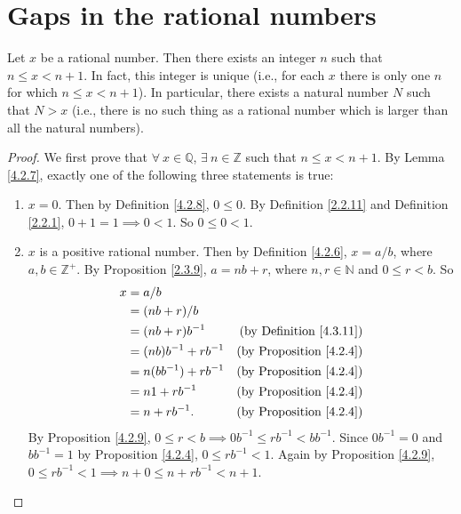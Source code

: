 \section{Gaps in the rational numbers}\label{sec 4.4}

\begin{proposition}\label{4.4.1}
Let \(x\) be a rational number.
Then there exists an integer \(n\) such that \(n \leq x < n + 1\).
In fact, this integer is unique (i.e., for each \(x\) there is only one \(n\) for which \(n \leq x < n + 1\)).
In particular, there exists a natural number \(N\) such that \(N > x\)
(i.e., there is no such thing as a rational number which is larger than all the natural numbers).
\end{proposition}

\begin{proof}
We first prove that \(\forall\ x \in \mathds{Q}\), \(\exists\ n \in \mathds{Z}\) such that \(n \leq x < n + 1\).
By Lemma \ref{4.2.7}, exactly one of the following three statements is true:
\begin{enumerate}
    \item \(x = 0\).
    Then by Definition \ref{4.2.8}, \(0 \leq 0\).
    By Definition \ref{2.2.11} and Definition \ref{2.2.1}, \(0 + 1 = 1 \implies 0 < 1\).
    So \(0 \leq 0 < 1\).
    \item \(x\) is a positive rational number.
    Then by Definition \ref{4.2.6}, \(x = a / b\), where \(a, b \in \mathds{Z}^+\).
    By Proposition \ref{2.3.9}, \(a = nb + r\), where \(n, r \in \mathds{N}\) and \(0 \leq r < b\).
    So
    \begin{align*}
    x &= a / b \\
    &= (nb + r) / b \\
    &= (nb + r)b^{-1} & \text{(by Definition \ref{4.3.11})} \\
    &= (nb)b^{-1} + rb^{-1} & \text{(by Proposition \ref{4.2.4})} \\
    &= n(bb^{-1}) + rb^{-1} & \text{(by Proposition \ref{4.2.4})} \\
    &= n1 + rb^{-1} & \text{(by Proposition \ref{4.2.4})} \\
    &= n + rb^{-1}. & \text{(by Proposition \ref{4.2.4})}
    \end{align*}
    By Proposition \ref{4.2.9}, \(0 \leq r < b \implies 0b^{-1} \leq rb^{-1} < bb^{-1}\).
    Since \(0b^{-1} = 0\) and \(bb^{-1} = 1\) by Proposition \ref{4.2.4}, \(0 \leq rb^{-1} < 1\).
    Again by Proposition \ref{4.2.9}, \(0 \leq rb^{-1} < 1 \implies n + 0 \leq n + rb^{-1} < n + 1\).

\end{enumerate}
\end{proof}
